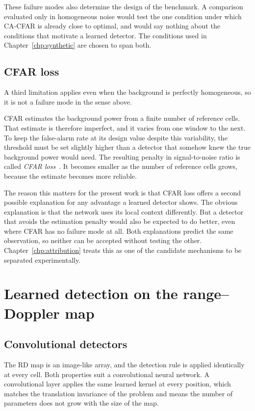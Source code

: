 These failure modes also determine the design of the benchmark. A comparison evaluated only in
homogeneous noise would test the one condition under which CA-CFAR is already close to optimal, and
would say nothing about the conditions that motivate a learned detector. The conditions used in
Chapter~\ref{chp:synthetic} are chosen to span both.

\subsection{CFAR loss}
\label{sec:cfar_loss}

A third limitation applies even when the background is perfectly homogeneous, so it is not a
failure mode in the sense above.

CFAR estimates the background power from a finite number of reference cells. That estimate is
therefore imperfect, and it varies from one window to the next. To keep the false-alarm rate at its
design value despite this variability, the threshold must be set slightly higher than a detector
that somehow knew the true background power would need. The resulting penalty in signal-to-noise
ratio is called \emph{CFAR loss}~\cite{richards2014radar}. It becomes smaller as the number of
reference cells grows, because the estimate becomes more reliable.

The reason this matters for the present work is that CFAR loss offers a second possible explanation
for any advantage a learned detector shows. The obvious explanation is that the network uses its
local context differently. But a detector that avoids the estimation penalty would also be expected
to do better, even where CFAR has no failure mode at all. Both explanations predict the same
observation, so neither can be accepted without testing the other.
Chapter~\ref{chp:attribution} treats this as one of the candidate mechanisms to be separated
experimentally.

\section{Learned detection on the range--Doppler map}

\subsection{Convolutional detectors}

The RD map is an image-like array, and the detection rule is applied identically at every cell.
Both properties suit a convolutional neural network. A convolutional layer applies the same learned
kernel at every position, which matches the translation invariance of the problem and means the
number of parameters does not grow with the size of the map.

